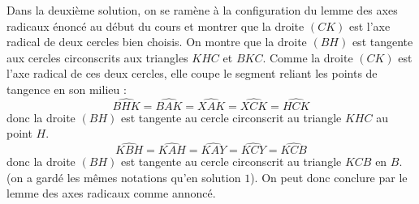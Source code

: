 \begin{sol}
\begin{center}
\end{center}

Dans la deuxième solution, on se ramène à la configuration du lemme des axes radicaux énoncé au début du cours et montrer que la droite $(CK)$ est l'axe radical de deux cercles bien choisis.
On montre que la droite $(BH)$ est tangente aux cercles circonscrits aux triangles $KHC$ et $BKC$. Comme la droite $(CK)$ est l'axe radical de ces deux cercles, elle coupe le segment reliant les points de tangence en son milieu :
$$\widehat{BHK}=\widehat{BAK}=\widehat{XAK}=\widehat{XCK}=\widehat{HCK}$$ donc la droite $(BH)$ est tangente au cercle circonscrit au triangle $KHC$ au point $H$.
$$\widehat{KBH}=\widehat{KAH}=\widehat{KAY}=\widehat{KCY}=\widehat{KCB}$$ donc la droite $(BH)$ est tangente au cercle circonscrit au triangle $KCB$ en $B$.
(on a gardé les mêmes notations qu'en solution $1$).
On peut donc conclure par le lemme des axes radicaux comme annoncé.
\end{sol}


